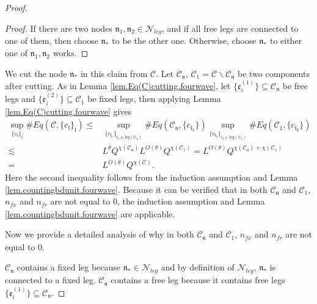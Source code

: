 \begin{proof}
\begin{proof}
    If there are two nodes $\mathfrak{n}_1, \mathfrak{n}_2\in \mathcal{N}_{leg}$, and if all free legs are connected to one of them, then choose $\mathfrak{n}_*$ to be the other one. Otherwise, choose $\mathfrak{n}_*$ to either one of $\mathfrak{n}_1, \mathfrak{n}_2$ works.
    \end{proof}
    
    We cut the node $\mathfrak{n}_*$ in this claim from $\mathcal{C}$. Let $\mathcal{C}_{\mathfrak{n}}$, $\mathcal{C}_1=\mathcal{C}\backslash \mathcal{C}_{\mathfrak{n}}$ be two components after cutting. As in Lemma \ref{lem.Eq(C)cutting.fourwave}, let $\{\mathfrak{e}_{i}^{(1)}\}\subseteq \mathcal{C}_{\mathfrak{n}}$ be free legs and $\{\mathfrak{e}_{i}^{(2)}\}\subseteq \mathcal{C}_1$ be fixed legs, then applying Lemma \ref{lem.Eq(C)cutting.fourwave} gives
    \begin{equation}
    \begin{split}
     \sup_{\{c_{\mathfrak{l}}\}_{\mathfrak{l}}}\#Eq(\mathcal{C},\{c_{\mathfrak{l}}\}_{\mathfrak{l}})\le&
     \sup_{\{c_{\mathfrak{l}_1}\}_{\mathfrak{l}_1\in \text{leg}(\mathcal{C}_{\mathfrak{n}})} } \# Eq(\mathcal{C}_{\mathfrak{n}},\{c_{\mathfrak{l}_1}\}) \sup_{\{c_{\mathfrak{l}_2}\}_{\mathfrak{l}_2\in \text{leg}(\mathcal{C}_1)} }\# Eq(\mathcal{C}_1, \{c_{\mathfrak{l}_2}\})
     \\
     \lesssim& L^{\theta} Q^{\chi(\mathcal{C}_{\mathfrak{n}})} L^{O(\theta)} Q^{\chi(\mathcal{C}_1)} = L^{O(\theta)} Q^{\chi(\mathcal{C}_{\mathfrak{n}})+\chi(\mathcal{C}_1)} \\
     =& L^{O(\theta)} Q^{\chi(\mathcal{C})}.
    \end{split}
    \end{equation}
    Here the second inequality follows from the induction assumption and Lemma \ref{lem.countingbdunit.fourwave}. Because it can be verified that in both $\mathcal{C}_{\mathfrak{n}}$ and $\mathcal{C}_1$, $n_{\textit{fx}}$ and $n_{\textit{fr}}$ are not equal to $0$, the induction assumption and Lemma \ref{lem.countingbdunit.fourwave} are applicable.
    
    Now we provide a detailed analysis of why in both $\mathcal{C}_{\mathfrak{n}}$ and $\mathcal{C}_1$, $n_{\textit{fx}}$ and $n_{\textit{fr}}$ are not equal to $0$. 
    
    $\mathcal{C}_{\mathfrak{n}}$ contains a fixed leg because $\mathfrak{n}_*\in \mathcal{N}_{leg}$ and by definition of $\mathcal{N}_{leg}$, $\mathfrak{n}_*$ is connected to a fixed leg. $\mathcal{C}_{\mathfrak{n}}$ contains a free leg because it contains free legs $\{\mathfrak{e}_{i}^{(1)}\}\subseteq \mathcal{C}_{\mathfrak{n}}$.
    

\end{proof}
